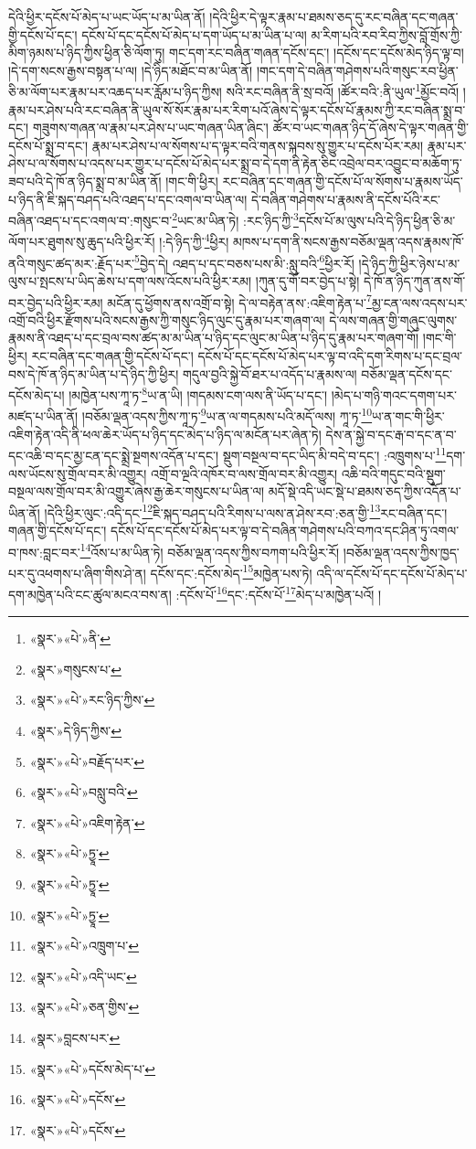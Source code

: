 དེའི་ཕྱིར་དངོས་པོ་མེད་པ་ཡང་ཡོད་པ་མ་ཡིན་ནོ། །དེའི་ཕྱིར་དེ་ལྟར་རྣམ་པ་ཐམས་ཅད་དུ་རང་བཞིན་དང་གཞན་གྱི་དངོས་པོ་དང་། དངོས་པོ་དང་དངོས་པོ་མེད་པ་དག་ཡོད་པ་མ་ཡིན་པ་ལ། མ་རིག་པའི་རབ་རིབ་ཀྱིས་བློ་གྲོས་ཀྱི་མིག་ཉམས་པ་ཉིད་ཀྱིས་ཕྱིན་ཅི་ལོག་ཏུ། གང་དག་རང་བཞིན་གཞན་དངོས་དང་། །དངོས་དང་དངོས་མེད་ཉིད་ལྟ་བ། །དེ་དག་སངས་རྒྱས་བསྟན་པ་ལ། །དེ་ཉིད་མཐོང་བ་མ་ཡིན་ནོ། །གང་དག་དེ་བཞིན་གཤེགས་པའི་གསུང་རབ་ཕྱིན་ཅི་མ་ལོག་པར་རྣམ་པར་འཆད་པར་རློམ་པ་ཉིད་ཀྱིས། སའི་རང་བཞིན་ནི་སྲ་བའོ། །ཚོར་བའི་:ནི་ཡུལ་\footnote{«སྣར་»«པེ་»ནི་}མྱོང་བའོ། །རྣམ་པར་ཤེས་པའི་རང་བཞིན་ནི་ཡུལ་སོ་སོར་རྣམ་པར་རིག་པའོ་ཞེས་དེ་ལྟར་དངོས་པོ་རྣམས་ཀྱི་རང་བཞིན་སྨྲ་བ་དང་། གཟུགས་གཞན་ལ་རྣམ་པར་ཤེས་པ་ཡང་གཞན་ཡིན་ཞིང་། ཚོར་བ་ཡང་གཞན་ཉིད་དོ་ཞེས་དེ་ལྟར་གཞན་གྱི་དངོས་པོ་སྨྲ་བ་དང་། རྣམ་པར་ཤེས་པ་ལ་སོགས་པ་ད་ལྟར་བའི་གནས་སྐབས་སུ་གྱུར་པ་དངོས་པོར་རམ། རྣམ་པར་ཤེས་པ་ལ་སོགས་པ་འདས་པར་གྱུར་པ་དངོས་པོ་མེད་པར་སྨྲ་བ་དེ་དག་ནི་རྟེན་ཅིང་འབྲེལ་བར་འབྱུང་བ་མཆོག་ཏུ་ཟབ་པའི་དེ་ཁོ་ན་ཉིད་སྨྲ་བ་མ་ཡིན་ནོ། །གང་གི་ཕྱིར། རང་བཞིན་དང་གཞན་གྱི་དངོས་པོ་ལ་སོགས་པ་རྣམས་ཡོད་པ་ཉིད་ནི་ཇི་སྐད་བཤད་པའི་འཐད་པ་དང་འགལ་བ་ཡིན་ལ། དེ་བཞིན་གཤེགས་པ་རྣམས་ནི་དངོས་པོའི་རང་བཞིན་འཐད་པ་དང་འགལ་བ་:གསུང་བ་\footnote{«སྣར་»གསུངས་པ་}ཡང་མ་ཡིན་ཏེ། :རང་ཉིད་ཀྱི་\footnote{«སྣར་»«པེ་»རང་ཉིད་ཀྱིས་}དངོས་པོ་མ་ལུས་པའི་དེ་ཉིད་ཕྱིན་ཅི་མ་ལོག་པར་ཐུགས་སུ་ཆུད་པའི་ཕྱིར་རོ། །:དེ་ཉིད་ཀྱི་\footnote{«སྣར་»དེ་ཉིད་ཀྱིས་}ཕྱིར། མཁས་པ་དག་ནི་སངས་རྒྱས་བཅོམ་ལྡན་འདས་རྣམས་ཁོ་ནའི་གསུང་ཚད་མར་:རྗོད་པར་\footnote{«སྣར་»«པེ་»བརྗོད་པར་}བྱེད་དེ། འཐད་པ་དང་བཅས་པས་མི་:སླུ་བའི་\footnote{«སྣར་»«པེ་»བསླུ་བའི་}ཕྱིར་རོ། །དེ་ཉིད་ཀྱི་ཕྱིར་ཉེས་པ་མ་ལུས་པ་སྤངས་པ་ཡིད་ཆེས་པ་དག་ལས་འོངས་པའི་ཕྱིར་རམ། །ཀུན་དུ་གོ་བར་བྱེད་པ་སྟེ། དེ་ཁོ་ན་ཉིད་ཀུན་ནས་གོ་བར་བྱེད་པའི་ཕྱིར་རམ། མངོན་དུ་ཕྱོགས་ནས་འགྲོ་བ་སྟེ། དེ་ལ་བརྟེན་ནས་:འཇིག་རྟེན་པ་\footnote{«སྣར་»«པེ་»འཇིག་རྟེན་}མྱ་ངན་ལས་འདས་པར་འགྲོ་བའི་ཕྱིར་རྫོགས་པའི་སངས་རྒྱས་ཀྱི་གསུང་ཉིད་ལུང་དུ་རྣམ་པར་གཞག་ལ། དེ་ལས་གཞན་གྱི་གཞུང་ལུགས་རྣམས་ནི་འཐད་པ་དང་བྲལ་བས་ཚད་མ་མ་ཡིན་པ་ཉིད་དང་ལུང་མ་ཡིན་པ་ཉིད་དུ་རྣམ་པར་གཞག་གོ། །གང་གི་ཕྱིར། རང་བཞིན་དང་གཞན་གྱི་དངོས་པོ་དང་། དངོས་པོ་དང་དངོས་པོ་མེད་པར་ལྟ་བ་འདི་དག་རིགས་པ་དང་བྲལ་བས་དེ་ཁོ་ན་ཉིད་མ་ཡིན་པ་དེ་ཉིད་ཀྱི་ཕྱིར། གདུལ་བྱའི་སྐྱེ་བོ་ཐར་པ་འདོད་པ་རྣམས་ལ། བཅོམ་ལྡན་དངོས་དང་དངོས་མེད་པ། །མཁྱེན་པས་ཀཱ་ཏ་\footnote{«སྣར་»«པེ་»ཏྱཱ་}ཡ་ན་ཡི། །གདམས་ངག་ལས་ནི་ཡོད་པ་དང་། །མེད་པ་གཉི་གའང་དགག་པར་མཛད་པ་ཡིན་ནོ། །བཅོམ་ལྡན་འདས་ཀྱིས་ཀཱ་ཏ་\footnote{«སྣར་»«པེ་»ཏྱཱ་}ཡ་ན་ལ་གདམས་པའི་མདོ་ལས། ཀཱ་ཏ་\footnote{«སྣར་»«པེ་»ཏྱཱ་}ཡ་ན་གང་གི་ཕྱིར་འཇིག་རྟེན་འདི་ནི་ཕལ་ཆེར་ཡོད་པ་ཉིད་དང་མེད་པ་ཉིད་ལ་མངོན་པར་ཞེན་ཏེ། དེས་ན་སྐྱེ་བ་དང་རྒ་བ་དང་ན་བ་དང་འཆི་བ་དང་མྱ་ངན་དང་སྨྲེ་སྔགས་འདོན་པ་དང་། སྡུག་བསྔལ་བ་དང་ཡིད་མི་བདེ་བ་དང་། :འཁྲུགས་པ་\footnote{«སྣར་»«པེ་»འཁྲུག་པ་}དག་ལས་ཡོངས་སུ་གྲོལ་བར་མི་འགྱུར། འགྲོ་བ་ལྔའི་འཁོར་བ་ལས་གྲོལ་བར་མི་འགྱུར། འཆི་བའི་གདུང་བའི་སྡུག་བསྔལ་ལས་གྲོལ་བར་མི་འགྱུར་ཞེས་རྒྱ་ཆེར་གསུངས་པ་ཡིན་ལ། མདོ་སྡེ་འདི་ཡང་སྡེ་པ་ཐམས་ཅད་ཀྱིས་འདོན་པ་ཡིན་ནོ། །དེའི་ཕྱིར་ལུང་:འདི་དང་\footnote{«སྣར་»«པེ་»འདི་ཡང་}ཇི་སྐད་བཤད་པའི་རིགས་པ་ལས་ན་ཤེས་རབ་:ཅན་གྱི་\footnote{«སྣར་»«པེ་»ཅན་གྱིས་}རང་བཞིན་དང་། གཞན་གྱི་དངོས་པོ་དང་། དངོས་པོ་དང་དངོས་པོ་མེད་པར་ལྟ་བ་དེ་བཞིན་གཤེགས་པའི་བཀའ་དང་ཤིན་ཏུ་འགལ་བ་ཁས་:བླང་བར་\footnote{«སྣར་»བླངས་པར་}འོས་པ་མ་ཡིན་ཏེ། བཅོམ་ལྡན་འདས་ཀྱིས་བཀག་པའི་ཕྱིར་རོ། །བཅོམ་ལྡན་འདས་ཀྱིས་ཁྱད་པར་དུ་འཕགས་པ་ཞིག་གིས་ཤེ་ན། དངོས་དང་:དངོས་མེད་\footnote{«སྣར་»«པེ་»དངོས་མེད་པ་}མཁྱེན་པས་ཏེ། འདི་ལ་དངོས་པོ་དང་དངོས་པོ་མེད་པ་དག་མཁྱེན་པའི་ངང་ཚུལ་མངའ་བས་ན། :དངོས་པོ་\footnote{«སྣར་»«པེ་»དངོས་}དང་:དངོས་པོ་\footnote{«སྣར་»«པེ་»དངོས་}མེད་པ་མཁྱེན་པའོ། །
